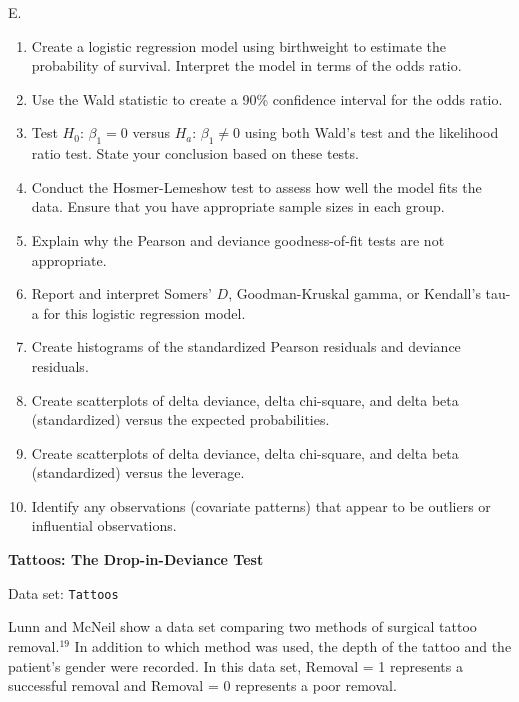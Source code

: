 \documentclass[
]{report}
\newcounter{excount}
\renewcommand{\theexcount}{E\arabic{excount}}
\begin{document}
\begin{list}{\theexcount.}{ \setlength{\itemsep}{1.2em}}
  \begin{enumerate}
    \item Create a logistic regression model using birthweight to estimate the probability of survival. Interpret the model in terms of the odds ratio.
    \item Use the Wald statistic to create a 90\% confidence interval for the odds ratio.
    \item Test $H_0$: $\beta_1 = 0$ versus $H_a$: $\beta_1 \ne 0$ using both Wald’s test and the likelihood ratio test. State your conclusion based on these tests.
    \item Conduct the Hosmer-Lemeshow test to assess how well the model fits the data. Ensure that you have appropriate sample sizes in each group.
    \item Explain why the Pearson and deviance goodness-of-fit tests are not appropriate.
    \item Report and interpret Somers’ $D$, Goodman-Kruskal gamma, or Kendall’s tau-a for this logistic regression model.
    \item Create histograms of the standardized Pearson residuals and deviance residuals.
    \item Create scatterplots of delta deviance, delta chi-square, and delta beta (standardized) versus the expected probabilities.
    \item Create scatterplots of delta deviance, delta chi-square, and delta beta (standardized) versus the leverage.
    \item Identify any observations (covariate patterns) that appear to be outliers or influential observations.
  \end{enumerate}

  \item \textbf{Tattoos: The Drop-in-Deviance Test}

Data set: \texttt{Tattoos}

Lunn and McNeil show a data set comparing two methods of surgical tattoo removal.$^{19}$ In addition to which method was used, the depth of the tattoo and the patient’s gender were recorded. In this data set, Removal = 1 represents a successful removal and Removal = 0 represents a poor removal.


\end{list}
\end{document}
